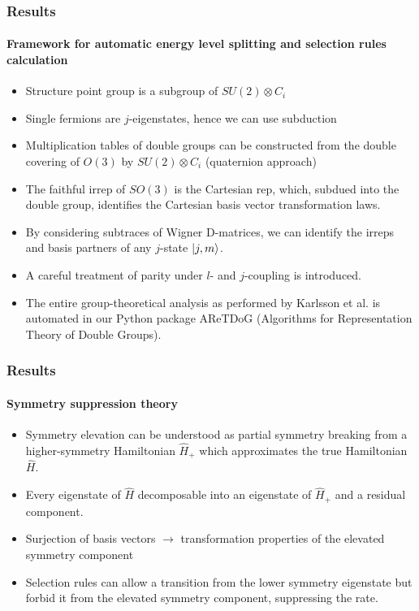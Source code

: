 \documentclass[english]{beamer}
\begin{document}
  \begin{frame}
  	\frametitle{Results}
  	\framesubtitle{Framework for automatic energy level splitting and selection rules calculation}
  	\begin{itemize}
  		\item Structure point group is a subgroup of $SU(2)\otimes C_i$
  		\item Single fermions are $j$-eigenstates, hence we can use subduction
  		\item Multiplication tables of double groups can be constructed from the double covering of $O(3)$ by $SU(2)\otimes C_i$ (quaternion approach)
  		\item The faithful irrep of $SO(3)$ is the Cartesian rep, which, subdued into the double group, identifies the Cartesian basis vector transformation laws.
  		\item By considering subtraces of Wigner D-matrices, we can identify the irreps and basis partners of any $j$-state $\ket{j,m}$.
  		\item A careful treatment of parity under $l$- and $j$-coupling is introduced.
  		\item The entire group-theoretical analysis as performed by Karlsson et al. is automated in our Python package AReTDoG (Algorithms for Representation Theory of Double Groups).
  	\end{itemize}
  \end{frame}
  
  \begin{frame}
  	\frametitle{Results}
  	\framesubtitle{Symmetry suppression theory}
  	\begin{itemize}
  		\item Symmetry elevation can be understood as partial symmetry breaking from a higher-symmetry Hamiltonian $\hat{H}_+$ which approximates the true Hamiltonian $\hat{H}$.
  		\item Every eigenstate of $\hat{H}$ decomposable into an eigenstate of $\hat{H}_+$ and a residual component.
  		\item Surjection of basis vectors $\rightarrow$ transformation properties of the elevated symmetry component
  		\item Selection rules can allow a transition from the lower symmetry eigenstate but forbid it from the elevated symmetry component, suppressing the rate.
  	\end{itemize}
  \end{frame}
  
\end{document}

